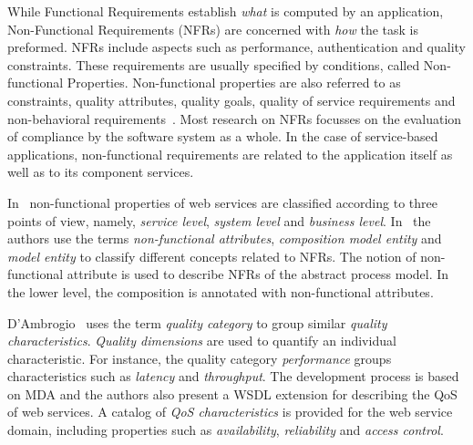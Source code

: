 While Functional Requirements establish \textit{what} is computed by an application, Non-Functional Requirements (NFRs) are concerned with \textit{how} the task is preformed.  
NFRs include aspects such as performance, authentication and quality constraints.
These requirements are usually specified by conditions, called Non-functional Properties.
Non-functional properties are also referred to as constraints, quality attributes, quality goals, quality of service requirements and non-behavioral requirements~\cite{Chung91,MylopoulosBook99,Chung2009}. 
Most research on NFRs focusses on the evaluation of compliance by the software system as a whole. %
In the case of service-based applications, non-functional requirements are related to the application itself as well as to its component services. 

In~\cite{Babamir2010,Yeom2006} non-functional properties of web services are classified according to three points of view, namely,  
\textit{service level}, \textit{system level} and \textit{business level}.
In~\cite{XiaoCZBOLH08} the authors use the terms  
\textit{non-functional attributes}, \textit{composition mo\-del entity} and \textit{mo\-del entity}  to classify different concepts related to NFRs.
The notion of non-functional attribute is used to describe NFRs of the abstract process model. 
In the lower level, the composition is annotated with non-functional attributes.

D'Ambrogio~\cite{DAmbrogio06} uses the term \textit{quality category} to group similar \textit{quality characteristics}. 
\textit{Quality dimensions} are used to quantify an individual characteristic.
For instance, the quality category \textit{performance} groups characteristics such as
\textit{latency} and \textit{throughput}. 
The development process is based on MDA and the authors also present a WSDL extension for describing the QoS of web services. A catalog of \textit{QoS characteristics} is provided for the web service domain, including properties such as \textit{availability}, \textit{reliability} and \textit{access control}. 

